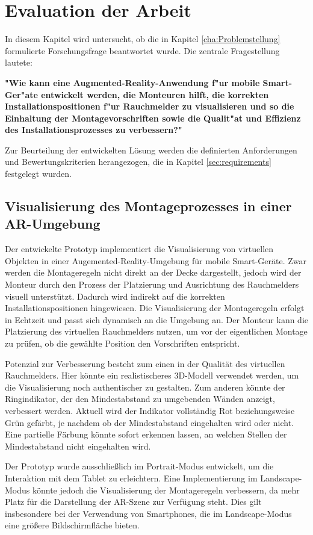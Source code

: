 \chapter{Evaluation der Arbeit}

In diesem Kapitel wird untersucht, ob die in Kapitel \ref{cha:Problemstellung} formulierte Forschungsfrage beantwortet wurde. Die zentrale Fragestellung lautete:

\textbf{"Wie kann eine Augmented-Reality-Anwendung f"ur mobile Smart-Ger"ate entwickelt werden, die Monteuren hilft, die korrekten Installationspositionen f"ur Rauchmelder zu visualisieren und so die Einhaltung der Montagevorschriften sowie die Qualit"at und Effizienz des Installationsprozesses zu verbessern?"}

Zur Beurteilung der entwickelten Lösung werden die definierten Anforderungen und Bewertungskriterien herangezogen, die in Kapitel \ref{sec:requirements} festgelegt wurden.

\section{Visualisierung des Montageprozesses in einer AR-Umgebung}

Der entwickelte Prototyp implementiert die Visualisierung von virtuellen Objekten in einer Augemented-Reality-Umgebung für mobile Smart-Geräte. Zwar werden die Montageregeln nicht direkt an der Decke dargestellt, jedoch wird der Monteur durch den Prozess der Platzierung und Ausrichtung des Rauchmelders visuell unterstützt. Dadurch wird indirekt auf die korrekten Installationspositionen hingewiesen. Die Visualisierung der Montageregeln erfolgt in Echtzeit und passt sich dynamisch an die Umgebung an. Der Monteur kann die Platzierung des virtuellen Rauchmelders nutzen, um vor der eigentlichen Montage zu prüfen, ob die gewählte Position den Vorschriften entspricht.

Potenzial zur Verbesserung besteht zum einen in der Qualität des virtuellen Rauchmelders. Hier könnte ein realistischeres 3D-Modell verwendet werden, um die Visualisierung noch authentischer zu gestalten. Zum anderen könnte der Ringindikator, der den Mindestabstand zu umgebenden Wänden anzeigt, verbessert werden. Aktuell wird der Indikator vollständig Rot beziehungsweise Grün gefärbt, je nachdem ob der Mindestabstand eingehalten wird oder nicht. Eine partielle Färbung könnte sofort erkennen lassen, an welchen Stellen der Mindestabstand nicht eingehalten wird.

Der Prototyp wurde ausschließlich im Portrait-Modus entwickelt, um die Interaktion mit dem Tablet zu erleichtern. Eine Implementierung im Landscape-Modus könnte jedoch die Visualisierung der Montageregeln verbessern, da mehr Platz für die Darstellung der AR-Szene zur Verfügung steht. Dies gilt insbesondere bei der Verwendung von Smartphones, die im Landscape-Modus eine größere Bildschirmfläche bieten.

